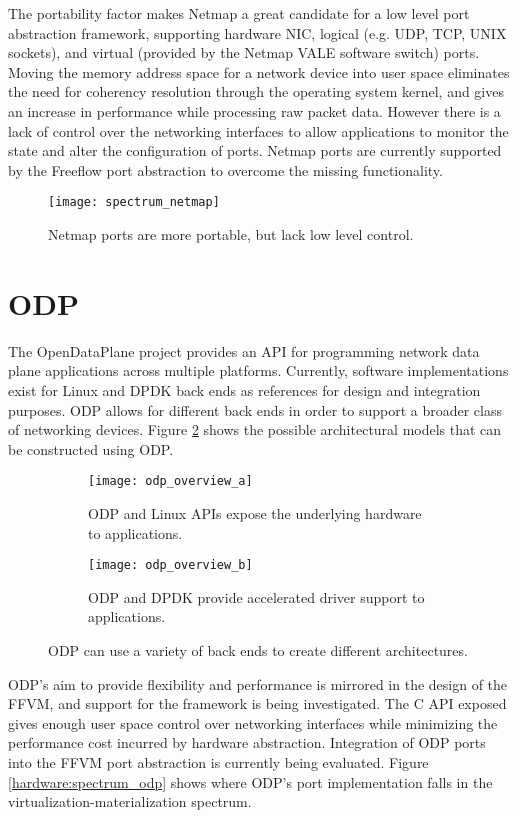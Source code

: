 The portability factor makes Netmap a great candidate for a low level port
abstraction framework, supporting hardware NIC, logical (e.g. UDP, TCP,
UNIX sockets), and virtual (provided by the Netmap VALE software switch) ports.
Moving the memory address space for a network device into user space eliminates
the need for coherency resolution through the operating system kernel, and gives
an increase in performance while processing raw packet data. However there is a
lack of control over the networking interfaces to allow applications to monitor
the state and alter the configuration of ports. Netmap ports are currently
supported by the Freeflow port abstraction to overcome the missing
functionality.

\begin{figure}[h!]
  \centering
  \texttt{[image: spectrum\_netmap]}
  \caption{Netmap ports are more portable, but lack low level control.}
  \label{hardware:spectrum_netmap}
\end{figure}

\section{ODP}
\label{hardware:odp}
The OpenDataPlane project provides an API for programming network data plane
applications across multiple platforms. Currently, software implementations
exist for Linux and DPDK back ends as references for design and integration
purposes. ODP allows for different back ends in order to support a broader class
of networking devices. Figure \ref{hardware:odp_overview} shows the possible
architectural models that can be constructed using ODP.

\begin{figure}[h!]
  \centering
  \begin{subfigure}[b]{0.48\textwidth}
    \centering
    \texttt{[image: odp\_overview\_a]}
    \caption{ODP and Linux APIs expose the underlying hardware to applications.}
  \end{subfigure}
  \hfill
  \begin{subfigure}[b]{0.48\textwidth}
    \centering
    \texttt{[image: odp\_overview\_b]}
    \caption{ODP and DPDK provide accelerated driver support to applications.}
  \end{subfigure}
  \caption{ODP can use a variety of back ends to create different architectures.}
  \label{hardware:odp_overview}
\end{figure}

ODP's aim to provide flexibility and performance is mirrored in the design of the
FFVM, and support for the framework is being investigated. The C API exposed gives
enough user space control over networking interfaces while minimizing the
performance cost incurred by hardware abstraction. Integration of ODP ports
into the FFVM port abstraction is currently being evaluated. Figure
\ref{hardware:spectrum_odp} shows where ODP's port implementation falls in the
virtualization-materialization spectrum.

